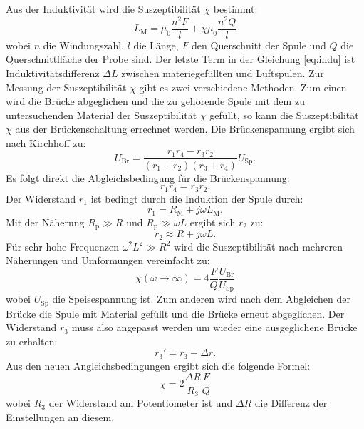 Aus der Induktivität wird die Suszeptibilität $\chi$ bestimmt:
\begin{equation}
\label{eq:indu}
L_\text{M} = \mu_0 \frac{n^2F}{l} + \chi \mu_0 \frac{n^2Q}{l}
\end{equation}
wobei $n$ die Windungszahl, $l$ die Länge, $F$ den Querschnitt der Spule und $Q$ die Querschnittfläche der Probe sind. Der letzte Term in der Gleichung \ref{eq:indu} ist Induktivitätsdifferenz $\Delta L$ zwischen materiegefüllten und Luftspulen. Zur Messung der Suszeptibilität $\chi$ gibt es zwei verschiedene Methoden. Zum einen wird die Brücke abgeglichen und die zu gehörende Spule mit dem zu untersuchenden Material der Suszeptibilität $\chi$ gefüllt, so kann die Suszeptibilität $\chi$ aus der Brückenschaltung errechnet werden. Die Brückenspannung ergibt sich nach Kirchhoff zu:
\begin{equation*}
U_\text{Br} = \frac{r_1r_4-r_3r_2}{(r_1+r_2)(r_3+r_4)}U_\text{Sp}.
\end{equation*}
Es folgt direkt die Abgleichsbedingung für die Brückenspannung:
\begin{equation*}
r_1r_4 = r_3r_2.
\end{equation*}
Der Widerstand $r_1$ ist bedingt durch die Induktion der Spule durch:
\begin{equation*}
r_1 = R_\text{M} + j \omega L_\text{M}.
\end{equation*}
Mit der Näherung $R_\text{p} \gg R $ und $R_\text{p} \gg \omega L$ ergibt sich $r_2$ zu:
\begin{equation*}
r_2 \approx R + j \omega L.
\end{equation*}
Für sehr hohe Frequenzen $\omega^2 L^2 \gg R^2$ wird die Suszeptibilität nach mehreren Näherungen und Umformungen vereinfacht zu:
\begin{equation}
\chi(\omega \rightarrow \infty) = 4 \frac{F}{Q}\frac{U_\text{Br}}{U_\text{Sp}}
\end{equation}
wobei $U_\text{Sp}$ die Speisespannung ist.
Zum anderen wird nach dem Abgleichen der Brücke die Spule mit Material gefüllt und die Brücke erneut abgeglichen.
Der Widerstand $r_3$ muss also angepasst werden um wieder eine ausgeglichene Brücke zu erhalten:
\begin{equation*}
r_3' = r_3 + \Delta r.
\end{equation*}
Aus den neuen Angleichsbedingungen ergibt sich die folgende Formel:
\begin{equation}
\chi = 2 \frac{\Delta R}{R_3}\frac{F}{Q}
\end{equation}
wobei $R_3$ der Widerstand am Potentiometer ist und $\Delta R$ die Differenz der Einstellungen an diesem.